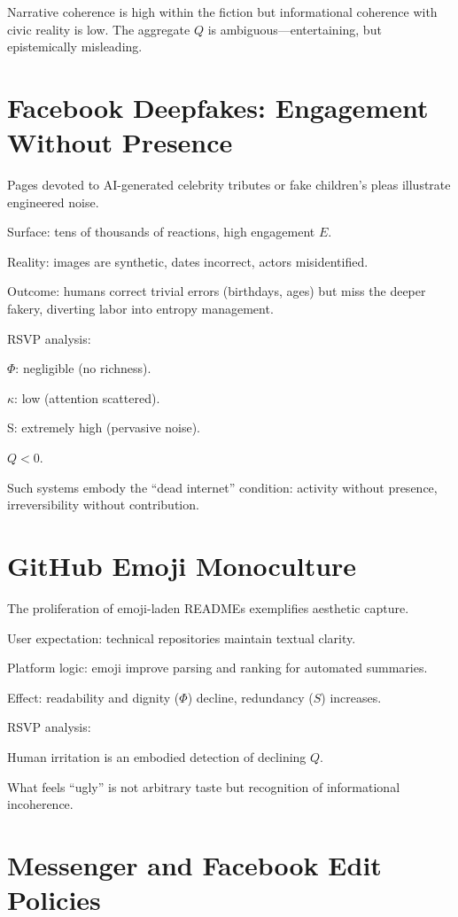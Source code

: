 \documentclass[openany]{book}
\begin{document}
Narrative coherence is high within the fiction but informational coherence with civic reality is low. The aggregate \( Q \) is ambiguous—entertaining, but epistemically misleading.

\section{Facebook Deepfakes: Engagement Without Presence}

Pages devoted to AI-generated celebrity tributes or fake children’s pleas illustrate engineered noise.

Surface: tens of thousands of reactions, high engagement \( E \).

Reality: images are synthetic, dates incorrect, actors misidentified.

Outcome: humans correct trivial errors (birthdays, ages) but miss the deeper fakery, diverting labor into entropy management.

RSVP analysis:

\(\Phi\): negligible (no richness).

\(\kappa\): low (attention scattered).

S: extremely high (pervasive noise).

\( Q < 0 \).

Such systems embody the ``dead internet'' condition: activity without presence, irreversibility without contribution.

\section{GitHub Emoji Monoculture}

The proliferation of emoji-laden READMEs exemplifies aesthetic capture.

User expectation: technical repositories maintain textual clarity.

Platform logic: emoji improve parsing and ranking for automated summaries.

Effect: readability and dignity (\( \Phi \)) decline, redundancy (\( S \)) increases.

RSVP analysis:

Human irritation is an embodied detection of declining \( Q \).

What feels ``ugly'' is not arbitrary taste but recognition of informational incoherence.

\section{Messenger and Facebook Edit Policies}
\end{document}
